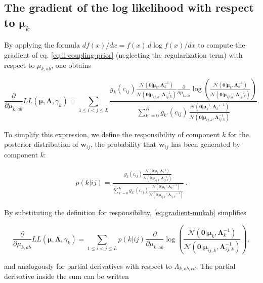 \documentclass[11pt,a4paper,twoside]{book}
\newcommand{\Gauss}{\mathcal{N}}
\newcommand{\Lijk}{\mathbf{\Lambda}_{ij,k}}
\newcommand{\Lk}{\mathbf{\Lambda}_k}
\newcommand{\muijk}{\mathbf{\mu}_{ij,k}}
\newcommand{\muk}{\mathbf{\mu}_k}
\newcommand{\cij}{c_{ij}}
\newcommand{\wij}{\mathbf{w}_{ij}}
\theoremstyle{definition}
\theoremstyle{definition}
\theoremstyle{remark}
\begin{document}
\subsection{\texorpdfstring{The gradient of the log likelihood with
respect to
\(\muk\)}{The gradient of the log likelihood with respect to \textbackslash{}muk}}\label{gradient-muk}

By applying the formula \(d f(x) / dx = f(x) \, d \log f(x) / dx\) to
compute the gradient of eq. \eqref{eq:ll-coupling-prior} (neglecting the
regularization term) with respect to \(\mu_{k,ab}\), one obtains

\begin{equation}
 \frac{\partial}{\partial \mu_{k,ab}} L\!L(\mathbf{\mu}, \mathbf{\Lambda}, \gamma_k)
    = \sum_{1\le i<j\le L}  
    \frac{ 
        g_{k}(\cij) \frac{  \Gauss ( \mathbf{0} | \muk, \Lk^{-1})}{\Gauss( \mathbf{0} | \muijk, \Lijk^{-1})} 
             \frac{\partial}{\partial \mu_{k,ab}}  \log \left( \frac{ \Gauss(\mathbf{0} | \muk, \Lk^{-1})}{\Gauss( \mathbf{0} | \muijk, \Lijk^{-1})} \right)  
     } { \sum_{k'=0}^K g_{k'}(\cij) \, \frac{ \Gauss(\mathbf{0} | \muk', \Lk'^{-1})}{\Gauss( \mathbf{0} | \muijk, \Lijk^{-1})}  } .
\label{eq:gradient-mukab}
\end{equation}

To simplify this expression, we define the responsibility of component
\(k\) for the posterior distribution of \(\wij\), the probability that
\(\wij\) has been generated by component \(k\):

\begin{align}
      p(k|ij)  = 
      \frac{ g_{k}(\cij) \frac{ \Gauss( \mathbf{0} | \muk, \Lk^{-1})}{\Gauss(\mathbf{0} | \muijk, \Lijk^{-1})} } 
    {\sum_{k'=0}^K g_{k'}(\cij) \frac{ \Gauss(\mathbf{0} | \muk', \Lk'^{-1})}{\Gauss( \mathbf{0} | \muijk', \Lijk'^{-1})} }  \,.
\label{eq:responsibilities}
\end{align}

By substituting the definition for responsibility,
\eqref{eq:gradient-mukab} simplifies

\begin{equation}
  \frac{\partial}{\partial \mu_{k,ab}}  L\!L(\mathbf{\mu}, \mathbf{\Lambda}, \gamma_k)
    = \sum_{1\le i<j\le L}  p(k | ij)  \frac{\partial}{\partial \mu_{k,ab}} \log \left( \frac{ \Gauss(\mathbf{0} | \muk, \Lk^{-1})}{\Gauss( \mathbf{0} | \muijk, \Lijk^{-1})} \right) ,
\label{eq:gradient-LL-mukab}
\end{equation}

and analogously for partial derivatives with respect to
\(\Lambda_{k,ab,cd}\). The partial derivative inside the sum can be
written
\end{document}
